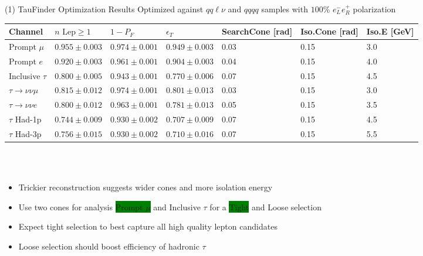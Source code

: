 \documentclass[10pt]{beamer}
\begin{document}
\begin{frame}{(1) TauFinder Optimization Results}
\scriptsize
Optimized against $qq\ell \nu$ and $qqqq$ samples with $100\% \, \, e^-_L e^+_R$ polarization 

\tiny
\begin{tabular}{|p{}|p{}p{}p{}p{}p{}p{}|}

\hline 
\rowcolor{lightgray}
Channel & $n \, \, \text{Lep} \geq 1$ & $1-P_{F}$ & $\epsilon_T$ & SearchCone [rad] & Iso.Cone [rad] & Iso.E [GeV] \\ 
\hline 
\rowcolor{green}
Prompt $\mu$ & $0.955 \pm 0.003$ & $0.974 \pm 0.001$ & $0.949 \pm 0.003$ & 0.03 & 0.15 & 3.0 \\ 

Prompt $e$ & $0.920 \pm 0.003$ & $0.961 \pm 0.001$ & $0.904 \pm 0.003$ & 0.04 & 0.15 & 4.0 \\ 
\rowcolor{emerald}
Inclusive $\tau$ & $0.800 \pm 0.005$ & $0.943 \pm 0.001$ &  $0.770 \pm 0.006$ & 0.07 & 0.15 & 4.5 \\ 


 \hline
$\tau \rightarrow \nu \nu \mu$ & $0.815 \pm 0.012$ & $0.974 \pm 0.001$ & $0.801 \pm 0.013$ & 0.03 & 0.15 & 3.0 \\ 
 
$\tau \rightarrow \nu \nu e$ &  $0.800 \pm 0.012$ & $0.963 \pm 0.001$ &  $0.781 \pm 0.013$ & 0.05 & 0.15 & 3.5 \\ 
 
$\tau$ Had-1p & $0.744 \pm 0.009$ & $0.930 \pm 0.002$ & $0.707 \pm 0.009$ & 0.07 & 0.15 & 4.5 \\ 
 
$\tau$ Had-3p &  $0.756 \pm 0.015$ & $0.930 \pm 0.002$ & $0.710 \pm 0.016$ & 0.07 & 0.15 & 5.5  \\
\hline
\end{tabular} 
\quad \quad \\
\quad \quad \\
\begin{itemize}
\scriptsize
\item Trickier reconstruction suggests wider cones and more isolation energy
\item Use two cones for analysis \colorbox{green}{Prompt $\mu$} and \colorbox{emerald}{Inclusive $\tau$} for a \colorbox{green}{Tight} and \colorbox{emerald}{Loose} selection
\item Expect tight selection to best capture all high quality lepton candidates
\item Loose selection should boost efficiency of hadronic $\tau$
\end{itemize}




\end{frame}
\end{document}
